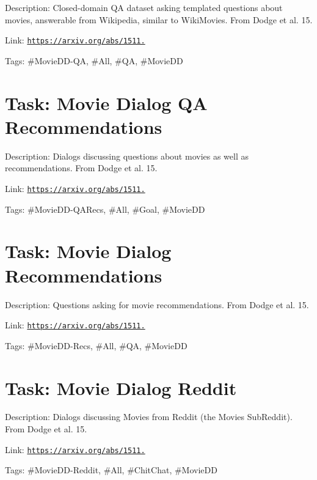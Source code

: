 Description\+: Closed-\/domain QA dataset asking templated questions about movies, answerable from Wikipedia, similar to Wiki\+Movies. From Dodge et al. \textquotesingle{}15.

Link\+: \href{https://arxiv.org/abs/1511.06931}{\tt https\+://arxiv.\+org/abs/1511.}

Tags\+: \#\+Movie\+DD-\/\+QA, \#\+All, \#\+QA, \#\+Movie\+DD

\section*{Task\+: Movie Dialog QA Recommendations }

Description\+: Dialogs discussing questions about movies as well as recommendations. From Dodge et al. \textquotesingle{}15.

Link\+: \href{https://arxiv.org/abs/1511.06931}{\tt https\+://arxiv.\+org/abs/1511.}

Tags\+: \#\+Movie\+DD-\/\+Q\+A\+Recs, \#\+All, \#\+Goal, \#\+Movie\+DD

\section*{Task\+: Movie Dialog Recommendations }

Description\+: Questions asking for movie recommendations. From Dodge et al. \textquotesingle{}15.

Link\+: \href{https://arxiv.org/abs/1511.06931}{\tt https\+://arxiv.\+org/abs/1511.}

Tags\+: \#\+Movie\+DD-\/\+Recs, \#\+All, \#\+QA, \#\+Movie\+DD

\section*{Task\+: Movie Dialog Reddit }

Description\+: Dialogs discussing Movies from Reddit (the Movies Sub\+Reddit). From Dodge et al. \textquotesingle{}15.

Link\+: \href{https://arxiv.org/abs/1511.06931}{\tt https\+://arxiv.\+org/abs/1511.}

Tags\+: \#\+Movie\+DD-\/\+Reddit, \#\+All, \#\+Chit\+Chat, \#\+Movie\+DD 